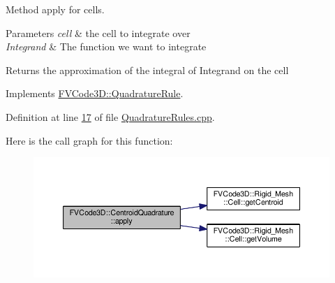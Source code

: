 Method apply for cells. 


\begin{DoxyParams}{Parameters}
{\em cell} & the cell to integrate over \\
\hline
{\em Integrand} & The function we want to integrate \\
\hline
\end{DoxyParams}
\begin{DoxyReturn}{Returns}
the approximation of the integral of Integrand on the cell 
\end{DoxyReturn}


Implements \hyperlink{classFVCode3D_1_1QuadratureRule_ab4dc6fefb61b96da71e47426985aa29b}{F\+V\+Code3\+D\+::\+Quadrature\+Rule}.



Definition at line \hyperlink{QuadratureRules_8cpp_source_l00017}{17} of file \hyperlink{QuadratureRules_8cpp_source}{Quadrature\+Rules.\+cpp}.



Here is the call graph for this function\+:
\nopagebreak
\begin{figure}[H]
\begin{center}
\leavevmode
\includegraphics[width=350pt]{classFVCode3D_1_1CentroidQuadrature_ad47227c7ea4d21c4323bc56e1c10fc18_cgraph}
\end{center}
\end{figure}


